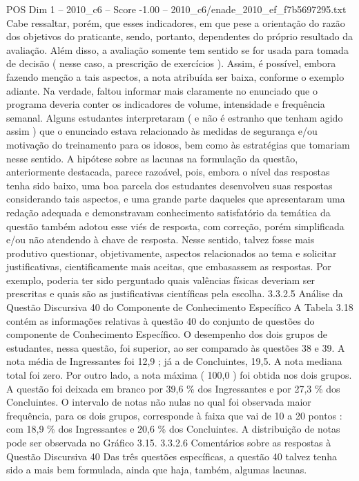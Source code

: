 \begin{textsample}{POS Dim 1 – 2010\_c6 – Score -1.00 – 2010\_c6/enade\_2010\_ef\_f7b5697295.txt}
Cabe ressaltar, porém, que esses indicadores, em que pese a orientação do razão dos objetivos do praticante, sendo, portanto, dependentes do próprio resultado da avaliação.
Além disso, a avaliação somente tem sentido se for usada para tomada de decisão ( nesse caso, a prescrição de exercícios ).
Assim, é possível, embora fazendo menção a tais aspectos, a nota atribuída ser baixa, conforme o exemplo adiante.
Na verdade, faltou informar mais claramente no enunciado que o programa deveria conter os indicadores de volume, intensidade e frequência semanal.
Alguns estudantes interpretaram ( e não é estranho que tenham agido assim ) que o enunciado estava relacionado às medidas de segurança e/ou motivação do treinamento para os idosos, bem como às estratégias que tomariam nesse sentido.
A hipótese sobre as lacunas na formulação da questão, anteriormente destacada, parece razoável, pois, embora o nível das respostas tenha sido baixo, uma boa parcela dos estudantes desenvolveu suas respostas considerando tais aspectos, e uma grande parte daqueles que apresentaram uma redação adequada e demonstravam conhecimento satisfatório da temática da questão também adotou esse viés de resposta, com correção, porém simplificada e/ou não atendendo à chave de resposta.
Nesse sentido, talvez fosse mais produtivo questionar, objetivamente, aspectos relacionados ao tema e solicitar justificativas, cientificamente mais aceitas, que embasassem as respostas.
Por exemplo, poderia ter sido perguntado quais valências físicas deveriam ser prescritas e quais são as justificativas científicas pela escolha. 3.3.2.5 Análise da Questão Discursiva 40 do Componente de Conhecimento Específico A Tabela 3.18 contém as informações relativas à questão 40 do conjunto de questões do componente de Conhecimento Específico.
O desempenho dos dois grupos de estudantes, nessa questão, foi superior, ao ser comparado às questões 38 e 39.
A nota média de Ingressantes foi 12,9 ; já a de Concluintes, 19,5.
A nota mediana total foi zero.
Por outro lado, a nota máxima ( 100,0 ) foi obtida nos dois grupos.
A questão foi deixada em branco por 39,6 \% dos Ingressantes e por 27,3 \% dos Concluintes.
O intervalo de notas não nulas no qual foi observada maior frequência, para os dois grupos, corresponde à faixa que vai de 10 a 20 pontos : com 18,9 \% dos Ingressantes e 20,6 \% dos Concluintes.
A distribuição de notas pode ser observada no Gráfico 3.15. 3.3.2.6 Comentários sobre as respostas à Questão Discursiva 40 Das três questões específicas, a questão 40 talvez tenha sido a mais bem formulada, ainda que haja, também, algumas lacunas.

\end{textsample}
